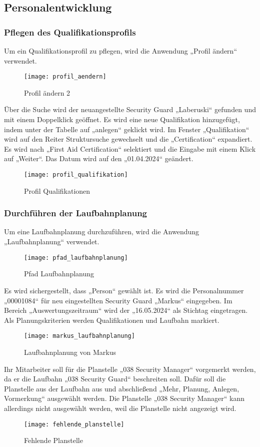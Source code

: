\subsection{Personalentwicklung}

\subsubsection{Pflegen des Qualifikationsprofils}
Um ein Qualifikationsprofil zu pflegen, wird die Anwendung „Profil ändern“ verwendet.
\begin{figure}[H]
	\centering
	\texttt{[image: profil\_aendern]}
	\caption{Profil ändern 2}
	\label{fig:profil_aendern2}
\end{figure}
Über die Suche wird der neuangestellte Security Guard „Laberuski“ gefunden und mit einem Doppelklick geöffnet. Es wird eine neue Qualifikation hinzugefügt, indem unter der Tabelle auf „anlegen“ geklickt wird. Im Fenster „Qualifikation“ wird auf den Reiter Struktursuche gewechselt und die „Certification“ expandiert. Es wird nach „First Aid Certification“ selektiert und die Eingabe mit einem Klick auf „Weiter“. Das Datum wird auf den „01.04.2024“ geändert.
\begin{figure}[H]
	\centering
	\texttt{[image: profil\_qualifikation]}
	\caption{Profil Qualifikationen}
	\label{fig:profil_qualifikation}
\end{figure}

\subsubsection{Durchführen der Laufbahnplanung}
Um eine Laufbahnplanung durchzuführen, wird die Anwendung „Laufbahnplanung“ verwendet.
\begin{figure}[H]
	\centering
	\texttt{[image: pfad\_laufbahnplanung]}
	\caption{Pfad Laufbahnplanung}
	\label{fig:pfad_laufbahnplanung}
\end{figure}
Es wird sichergestellt, dass „Person“ gewählt ist. Es wird die Personalnummer „00001084“ für neu eingestellten Security Guard „Markus“ eingegeben. Im Bereich „Auswertungszeitraum“ wird der „16.05.2024“ als Stichtag eingetragen. Als Planungskriterien werden Qualifikationen und Laufbahn markiert.
\begin{figure}[H]
	\centering
	\texttt{[image: markus\_laufbahnplanung]}
	\caption{Laufbahnplanung von Markus}
	\label{fig:markus_laufbahnplanung}
\end{figure}
Ihr Mitarbeiter soll für die Planstelle „038 Security Manager“ vorgemerkt werden, da er die Laufbahn „038 Security Guard“ beschreiten soll. Dafür soll die Planstelle aus der Laufbahn aus und abschließend „Mehr, Planung, Anlegen, Vormerkung“ ausgewählt werden. Die Planstelle „038 Security Manager“ kann allerdings nicht ausgewählt werden, weil die Planstelle nicht angezeigt wird. 
\begin{figure}[H]
	\centering
	\texttt{[image: fehlende\_planstelle]}
	\caption{Fehlende Planstelle}
	\label{fig:fehlende_planstelle}
\end{figure}

